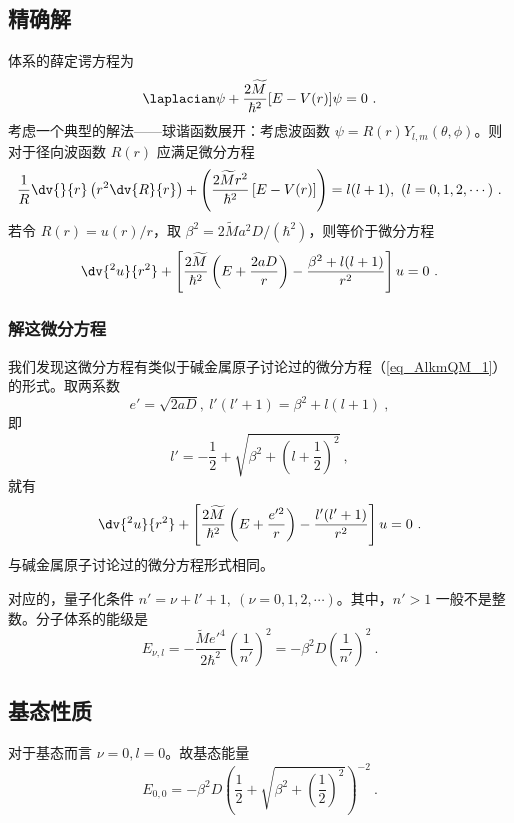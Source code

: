 \subsection{精确解}
体系的薛定谔方程为
\begin{equation}
\laplacian \psi + \frac{2 \widetilde M}{\hbar^2} [E - V(r)] \psi = 0~.
\end{equation}
考虑一个典型的解法——球谐函数展开：考虑波函数 $\psi = R(r) Y_{l, m} (\theta, \phi)$。则对于径向波函数 $R(r)$ 应满足微分方程
\begin{equation}
\frac1R \dv{}{r}\left(r^2 \dv{R}{r}\right) + \left( \frac{2\widetilde M r^2}{\hbar^2} \left[E-V(r)\right] \right) = l(l+1), \ (l = 0, 1, 2, \cdots) ~.
\end{equation}
若令 $R(r) = u(r)/r$，取 $\beta^2=2\widetilde M a^2 D/(\hbar^2)$，则等价于微分方程
\begin{equation}
\dv{^2 u}{r^2} + \left[\frac{2\widetilde M}{\hbar^2} \left(E + \frac{2aD}{r}\right) - \frac{\beta^2 + l(l+1)}{r^2}\right] u = 0 ~.
\end{equation}

\subsubsection{解这微分方程}
我们发现这微分方程有类似于碱金属原子讨论过的微分方程（\autoref{eq_AlkmQM_1}）的形式。取两系数
\begin{equation}
e' = \sqrt{2aD},\ l'(l'+1) = \beta^2 + l(l+1) ~,
\end{equation}
即
$$l' = -\frac12 + \sqrt{\beta^2 + \left(l + \frac12\right)^2} ~,$$
就有
\begin{equation}
\dv{^2 u}{r^2} + \left[ \frac{2 \widetilde M}{\hbar^2} \left(E + \frac{e'^2}{r}\right)  - \frac{l'(l'+1)}{r^2}\right] u = 0 ~.
\end{equation}
与碱金属原子讨论过的微分方程形式相同。

对应的，量子化条件 $n' = \nu + l' + 1, \ (\nu = 0, 1, 2, \cdots)$。其中，$n' > 1$ 一般不是整数。分子体系的能级是
\begin{equation}
E_{\nu, l} = -\frac{\widetilde M e'^4}{2 \hbar^2} \left(\frac1{n'}\right)^2 = -\beta^2 D \left(\frac{1}{n'}\right)^2 ~.
\end{equation}

\subsection{基态性质}
对于基态而言 $\nu=0, l=0$。故基态能量
\begin{equation}
E_{0, 0} = -\beta^2 D \left(\frac12 + \sqrt{\beta^2 + \left(\frac12\right)^2}\right)^{-2} ~.
\end{equation}


